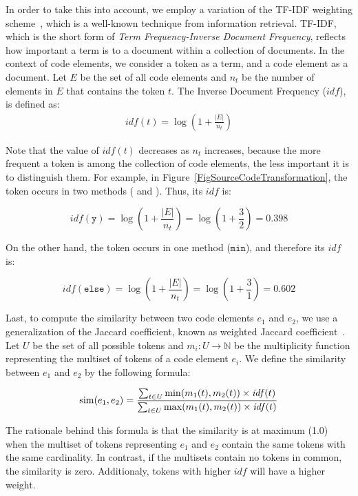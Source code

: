 In order to take this into account, we employ a variation of the TF-IDF weighting scheme~\citep{salton1986introduction}, which is a well-known technique from information retrieval.
TF-IDF, which is the short form of \emph{Term Frequency-Inverse Document Frequency}, reflects how important a term is to a document within a collection of documents.
In the context of code elements, we consider a token as a term, and a code element as a document.
Let $E$ be the set of all code elements and $n_t$ be the number of elements in $E$ that contains the token $t$. The Inverse Document Frequency ($\mathit{idf}$), is defined as:
\begin{align}
\mathit{idf}(t) = \log (1 + \frac{|E|}{n_t})
\end{align}

Note that the value of $\mathit{idf}(t)$ decreases as $n_t$ increases, because the more frequent a token is among the collection of code elements, the less important it is to distinguish them.
For example, in Figure~\ref{FigSourceCodeTransformation}, the token  occurs in two methods ( and ). Thus, its $\mathit{idf}$ is:

\[
\mathit{idf}(\mathtt{y}) = 
\log (1 + \frac{|E|}{n_t}) = 
\log (1 + \frac{3}{2}) = 0.398
\]

On the other hand, the token  occurs in one method ($\mathtt{min}$), and therefore its $\mathit{idf}$ is:

\[
\mathit{idf}(\mathtt{else}) = 
\log (1 + \frac{|E|}{n_t}) = 
\log (1 + \frac{3}{1}) = 0.602
\]

Last, to compute the similarity between two code elements $e_1$ and $e_2$, we use a generalization of the Jaccard coefficient, known as weighted Jaccard coefficient~\citep{chierichetti2010finding}.
Let $U$ be the set of all possible tokens and $m_i: U \to \mathbb{N}$ be the multiplicity function representing the multiset of tokens of a code element $e_i$.
We define the similarity between $e_1$ and $e_2$ by the following formula:


\begin{align}
\label{WJaccard}
\operatorname{sim}(e_1, e_2) = \frac{\sum_{t \in U} \min(m_1(t), m_2(t)) \times \mathit{idf}(t) }
                        {\sum_{t \in U} \max(m_1(t), m_2(t)) \times \mathit{idf}(t) }
\end{align}

The rationale behind this formula is that the similarity is at maximum (1.0) when the multiset of tokens representing $e_1$ and $e_2$ contain the same tokens with the same cardinality. In contrast, if the multisets contain no tokens in common, the similarity is zero. Additionaly, tokens with higher $\mathit{idf}$ will have a higher weight.


